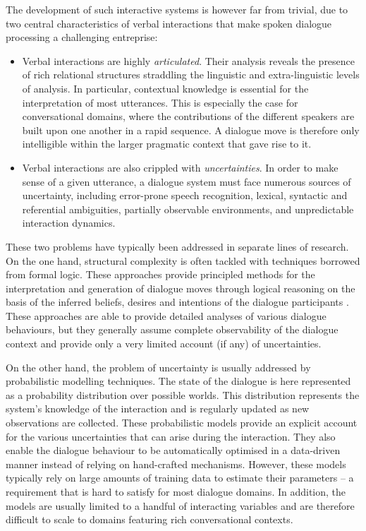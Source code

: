 The development of such interactive systems is however far from trivial, due to two central characteristics of verbal interactions that make spoken dialogue processing a challenging entreprise:
\begin{itemize}
\item Verbal interactions are highly \textit{articulated}.  Their analysis reveals the presence of rich relational structures straddling the linguistic and extra-linguistic levels of analysis. 
In particular, contextual knowledge is essential for the interpretation of most utterances. This is especially the case for conversational domains, where the contributions of the different speakers are built upon one another in a rapid sequence. A dialogue move is therefore only intelligible within the larger pragmatic context that gave rise to it. 
\item Verbal interactions are also crippled with \textit{uncertainties}.  In order to make sense of a given utterance, a dialogue system must face numerous sources of uncertainty, including error-prone speech recognition, lexical,  syntactic and referential ambiguities, partially observable environments, and unpredictable interaction dynamics.  
\end{itemize} 

These two problems have typically been addressed in separate lines of research.  On the one hand, structural complexity is often tackled with techniques borrowed from formal logic.  These approaches provide principled methods for the interpretation and generation of dialogue moves through logical reasoning on the basis of the inferred beliefs, desires and intentions of the dialogue participants \citep{Allen1980}. These approaches are able to provide detailed analyses of various dialogue behaviours, but they generally assume complete observability of the dialogue context and provide only a very limited account (if any) of uncertainties.

On the other hand, the problem of uncertainty is usually addressed by probabilistic modelling techniques.  The state of the dialogue is here represented as a probability distribution over possible worlds.  This distribution represents the system's knowledge of the interaction and is regularly updated as new observations are collected. These probabilistic models provide an explicit account for the various uncertainties that can arise during the interaction. They also enable the dialogue behaviour to be automatically optimised in a data-driven manner instead of relying on hand-crafted mechanisms.  However, these models typically rely on large amounts of training data to estimate their parameters -- a requirement that is hard to satisfy for most dialogue domains.  In addition, the models are usually limited to a handful of interacting variables and are therefore difficult to scale to domains featuring rich conversational contexts. 

